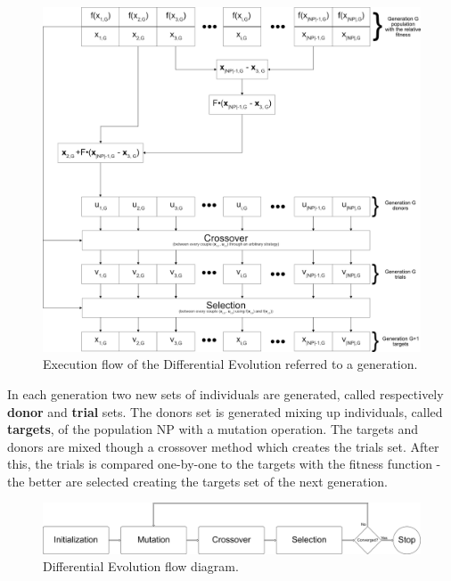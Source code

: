 \begin{figure}[t]
	\centering
	\includegraphics[width=\textwidth]{figures/de-flow-complete.png}
	\caption{Execution flow of the Differential Evolution referred to a generation.}
	\label{fig:bin-crossover}
\end{figure}
In each generation two new sets of individuals are generated, called respectively \textbf{donor} and \textbf{trial} sets. The donors set is generated mixing up individuals, called \textbf{targets}, of the population NP with a mutation operation. The targets and donors are mixed though a crossover method which creates the trials set. After this, the trials is compared one-by-one to the targets with the fitness function - the better are selected creating the targets set of the next generation. \\

\begin{figure}[t]
	\centering
	\includegraphics[width=\textwidth]{figures/de-flow.png}
	\caption{Differential Evolution flow diagram.}
\end{figure}

